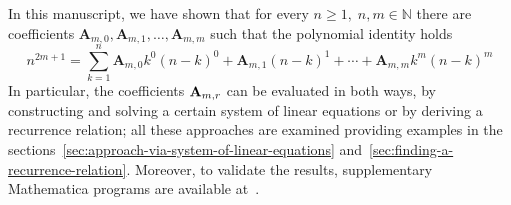 In this manuscript, we have shown that for every $n\geq 1, \; n,m\in\mathbb{N}$
there are coefficients $\mathbf{A}_{m,0}, \mathbf{A}_{m,1}, \ldots, \mathbf{A}_{m,m}$ such that
the polynomial identity holds
\[
    n^{2m+1} = \sum_{k=1}^{n} \mathbf{A}_{m,0} k^0 (n-k)^0 + \mathbf{A}_{m,1}(n-k)^1
    + \cdots + \mathbf{A}_{m,m} k^m (n-k)^m
\]
In particular, the coefficients ${\mathbf{A}} \sb{m,r}$ can be evaluated in both ways,
by constructing and solving a certain system of linear equations or by deriving a recurrence relation;
all these approaches are examined providing examples
in the sections~\eqref{sec:approach-via-system-of-linear-equations} and~\eqref{sec:finding-a-recurrence-relation}.
Moreover, to validate the results, supplementary Mathematica programs are available at~\cite{kolosov2023github}.
